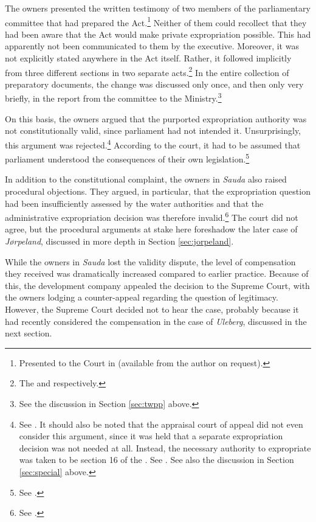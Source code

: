 The owners presented the written testimony of two members of the parliamentary committee that had prepared the Act.\footnote{Presented to the Court in \cite{sauda07} (available from the author on request).} Neither of them could recollect that they had been aware that the Act would make private expropriation possible. This had apparently not been communicated to them by the executive. Moreover, it was not explicitly stated anywhere in the Act itself. Rather, it followed implicitly from three different sections in two separate acts.\footnote{The \cite[51]{wra00} and \cite[2][3]{ea59} respectively.} In the entire collection of preparatory documents, the change was discussed only once, and then only very briefly, in the report from the committee to the Ministry.\footnote{See the discussion in Section \ref{sec:twpp} above.}

On this basis, the owners argued that the purported expropriation authority was not constitutionally valid, since parliament had not intended it. Unsurprisingly, this argument was rejected.\footnote{See \cite{sauda07}. It should also be noted that the appraisal court of appeal did not even consider this argument, since it was held that a separate expropriation decision was not needed at all. Instead, the necessary authority to expropriate was taken to be section 16 of the \cite{wra17}. See \cite{sauda09}. See also the discussion in Section \ref{sec:special} above.} According to the court, it had to be assumed that parliament understood the consequences of their own legislation.\footnote{See \cite{sauda07}.} 

In addition to the constitutional complaint, the owners in {\it Sauda} also raised procedural objections. They argued, in particular, that the expropriation question had been insufficiently assessed by the water authorities and that the administrative expropriation decision was therefore invalid.\footnote{See \cite{sauda09}.} The court did not agree, but the procedural arguments at stake here foreshadow the later case of {\it Jørpeland}, discussed in more depth in Section \ref{sec:jorpeland}.

While the owners in {\it Sauda} lost the validity dispute, the level of compensation they received was dramatically increased compared to earlier practice. Because of this, the development company appealed the decision to the Supreme Court, with the owners lodging a counter-appeal regarding the question of legitimacy. However, the Supreme Court decided not to hear the case, probably because it had recently considered the compensation in the case of {\it Uleberg}, discussed in the next section.

